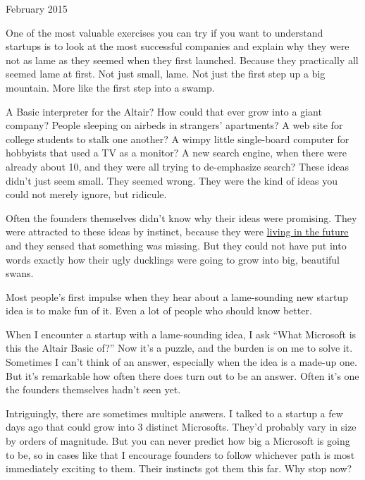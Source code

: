 February 2015

One of the most valuable exercises you can try if you want to understand
startups is to look at the most successful companies and explain why
they were not as lame as they seemed when they first launched. Because
they practically all seemed lame at first. Not just small, lame. Not
just the first step up a big mountain. More like the first step into a
swamp.

A Basic interpreter for the Altair? How could that ever grow into a
giant company? People sleeping on airbeds in strangers' apartments? A
web site for college students to stalk one another? A wimpy little
single-board computer for hobbyists that used a TV as a monitor? A new
search engine, when there were already about 10, and they were all
trying to de-emphasize search? These ideas didn't just seem small. They
seemed wrong. They were the kind of ideas you could not merely ignore,
but ridicule.

Often the founders themselves didn't know why their ideas were
promising. They were attracted to these ideas by instinct, because they
were \href{startupideas.html}{living in the future} and they sensed that
something was missing. But they could not have put into words exactly
how their ugly ducklings were going to grow into big, beautiful swans.

Most people's first impulse when they hear about a lame-sounding new
startup idea is to make fun of it. Even a lot of people who should know
better.

When I encounter a startup with a lame-sounding idea, I ask ``What
Microsoft is this the Altair Basic of?'' Now it's a puzzle, and the
burden is on me to solve it. Sometimes I can't think of an answer,
especially when the idea is a made-up one. But it's remarkable how often
there does turn out to be an answer. Often it's one the founders
themselves hadn't seen yet.

Intriguingly, there are sometimes multiple answers. I talked to a
startup a few days ago that could grow into 3 distinct Microsofts.
They'd probably vary in size by orders of magnitude. But you can never
predict how big a Microsoft is going to be, so in cases like that I
encourage founders to follow whichever path is most immediately exciting
to them. Their instincts got them this far. Why stop now?
